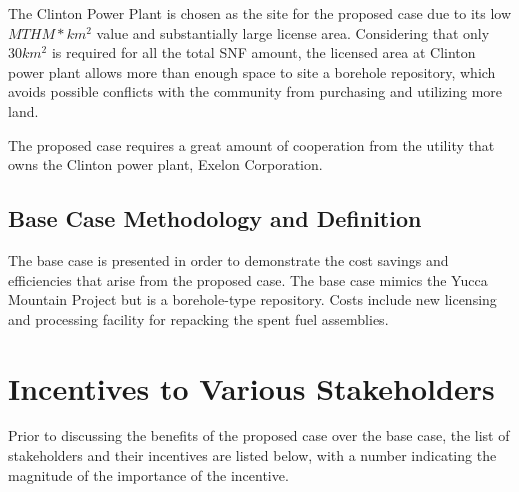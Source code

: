 \documentclass{anstrans}
\begin{document}
The Clinton Power Plant is chosen as the site for the proposed case due to its
low $MTHM*km^2$ value and substantially large license area. Considering that only
 $30km^2$ is required for all the total \gls{SNF} amount, the licensed area at Clinton power plant allows more than  enough space to site a borehole repository, which avoids
  possible conflicts with the community from purchasing and utilizing more land. 
  
  The proposed case requires a great amount of cooperation from the utility that owns
  the Clinton power plant, Exelon Corporation. 
  
\subsection{Base Case Methodology and Definition}
The base case is presented in order to demonstrate the cost savings and efficiencies 
that arise from the proposed case. The base case mimics the Yucca Mountain Project
but is a borehole-type repository. Costs include new licensing and processing facility
 for repacking the spent fuel assemblies.


\section {Incentives to Various Stakeholders}

Prior to discussing the benefits of the proposed case over the base case, the list of
 stakeholders and their incentives are listed below, with a number indicating the 
 magnitude of the importance of the incentive.
 
 
\begin{table}[h]

\centering
\caption {Incentive Criterion and Weight for Each Stakeholder}
\end{table}
\end{document}
